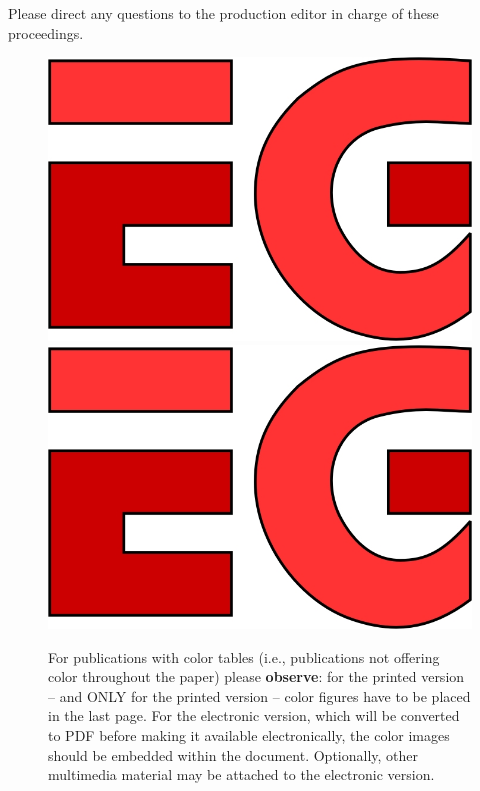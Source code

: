 \documentclass{egpubl}
\begin{document}
	Please direct any questions to the production editor in charge of
	these proceedings.
	
	
	
	
	
	
	\newpage
	
	
	\begin{figure}[tbp]
		\centering
		\mbox{} \hfill
		\includegraphics[width=.3\linewidth]{sampleFig}
		\hfill
		\includegraphics[width=.3\linewidth]{sampleFig}
		\hfill \mbox{}
		\caption{\label{fig:ex3}%
			For publications with color tables (i.e., publications not offering
			color throughout the paper) please \textbf{observe}: 
			for the printed version -- and ONLY for the printed
			version -- color figures have to be placed in the last page.
			\newline
			For the electronic version, which will be converted to PDF before
			making it available electronically, the color images should be
			embedded within the document. Optionally, other multimedia
			material may be attached to the electronic version. }
	\end{figure}
	
\end{document}
